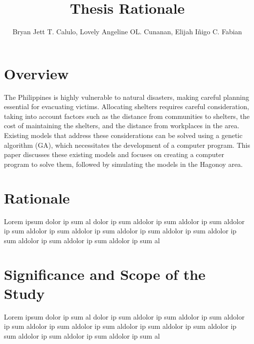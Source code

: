 \documentclass[english,12pt,a4paper]{article}
\title{Thesis Rationale}
\author{Bryan Jett T. Calulo, Lovely Angeline OL. Cunanan, Elijah Iñigo C. Fabian}
\begin{document}
	\maketitle
	
	\section*{Overview}
	
	The Philippines is highly vulnerable to natural disasters, making careful planning essential for evacuating victims. Allocating shelters requires careful consideration, taking into account factors such as the distance from communities to shelters, the cost of maintaining the shelters, and the distance from workplaces in the area. Existing models that address these considerations can be solved using a genetic algorithm (GA), which necessitates the development of a computer program. This paper discusses these existing models and focuses on creating a computer program to solve them, followed by simulating the models in the Hagonoy area.
	
	\section*{Rationale}
	Lorem ipsum dolor ip sum al dolor ip sum aldolor ip sum aldolor ip sum aldolor ip sum aldolor ip sum aldolor ip sum aldolor ip sum aldolor ip sum aldolor ip sum aldolor ip sum aldolor ip sum aldolor ip sum al
	
	\section*{Significance and Scope of the Study}
	Lorem ipsum dolor ip sum al dolor ip sum aldolor ip sum aldolor ip sum aldolor ip sum aldolor ip sum aldolor ip sum aldolor ip sum aldolor ip sum aldolor ip sum aldolor ip sum aldolor ip sum aldolor ip sum al
	
\end{document}
